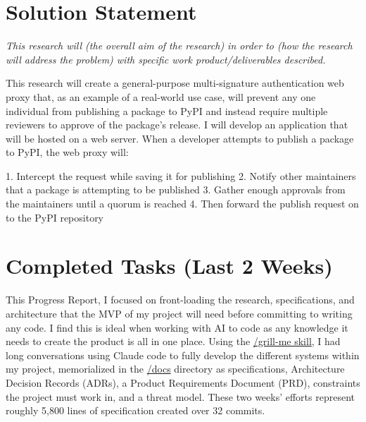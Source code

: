 \documentclass[12pt]{article}
\newcommand{\PRNumber}{2}
\newcommand{\RepoURL}{https://github.com/Ian-Costa18/Cybersecurity-Practicum/blob/progress-report-\PRNumber}
\newcommand{\instruction}[1]{{\small\itshape #1}}
\begin{document}
\section*{Solution Statement}

\instruction{This research will (the overall aim of the research) in order to (how the research will address the problem) with specific work product/deliverables described.}

This research will create a general-purpose multi-signature authentication web proxy that, as an example of a real-world use case, will prevent any one individual from publishing a package to PyPI and instead require multiple reviewers to approve of the package's release. I will develop an application that will be hosted on a web server. When a developer attempts to publish a package to PyPI, the web proxy will:

1. Intercept the request while saving it for publishing
2. Notify other maintainers that a package is attempting to be published
3. Gather enough approvals from the maintainers until a quorum is reached
4. Then forward the publish request on to the PyPI repository

\section*{Completed Tasks (Last 2 Weeks)}

This Progress Report, I focused on front-loading the research, specifications, and architecture that the MVP of my project will need before committing to writing any code. I find this is ideal when working with AI to code as any knowledge it needs to create the product is all in one place. Using the \href{https://github.com/mattpocock/skills\#engineering}{/grill-me skill}, I had long conversations using Claude code to fully develop the different systems within my project, memorialized in the \href{\RepoURL/docs}{/docs} directory as specifications, Architecture Decision Records (ADRs), a Product Requirements Document (PRD), constraints the project must work in, and a threat model. These two weeks' efforts represent roughly 5,800 lines of specification created over 32 commits.
\end{document}

